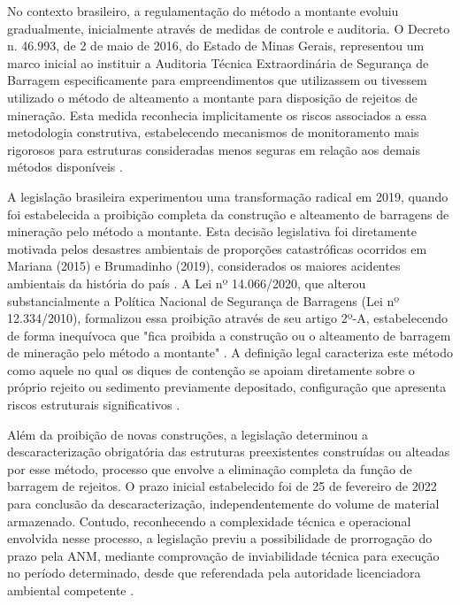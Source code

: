 No contexto brasileiro, a regulamentação do método a montante evoluiu gradualmente, inicialmente através de medidas de controle e auditoria. O Decreto n. 46.993, de 2 de maio de 2016, do Estado de Minas Gerais, representou um marco inicial ao instituir a Auditoria Técnica Extraordinária de Segurança de Barragem especificamente para empreendimentos que utilizassem ou tivessem utilizado o método de alteamento a montante para disposição de rejeitos de mineração. Esta medida reconhecia implicitamente os riscos associados a essa metodologia construtiva, estabelecendo mecanismos de monitoramento mais rigorosos para estruturas consideradas menos seguras em relação aos demais métodos disponíveis \cite{thome2018}.

A legislação brasileira experimentou uma transformação radical em 2019, quando foi estabelecida a proibição completa da construção e alteamento de barragens de mineração pelo método a montante. Esta decisão legislativa foi diretamente motivada pelos desastres ambientais de proporções catastróficas ocorridos em Mariana (2015) e Brumadinho (2019), considerados os maiores acidentes ambientais da história do país \cite{anm2023barragens, cbhsf2020, agenciabrasil2019}. A Lei nº 14.066/2020, que alterou substancialmente a Política Nacional de Segurança de Barragens (Lei nº 12.334/2010), formalizou essa proibição através de seu artigo 2º-A, estabelecendo de forma inequívoca que "fica proibida a construção ou o alteamento de barragem de mineração pelo método a montante" \cite{anm2023barragens, cbhsf2020}. A definição legal caracteriza este método como aquele no qual os diques de contenção se apoiam diretamente sobre o próprio rejeito ou sedimento previamente depositado, configuração que apresenta riscos estruturais significativos \cite{anm2023barragens}.

Além da proibição de novas construções, a legislação determinou a descaracterização obrigatória das estruturas preexistentes construídas ou alteadas por esse método, processo que envolve a eliminação completa da função de barragem de rejeitos. O prazo inicial estabelecido foi de 25 de fevereiro de 2022 para conclusão da descaracterização, independentemente do volume de material armazenado. Contudo, reconhecendo a complexidade técnica e operacional envolvida nesse processo, a legislação previu a possibilidade de prorrogação do prazo pela ANM, mediante comprovação de inviabilidade técnica para execução no período determinado, desde que referendada pela autoridade licenciadora ambiental competente \cite{anm2023barragens, cbhsf2020}.

